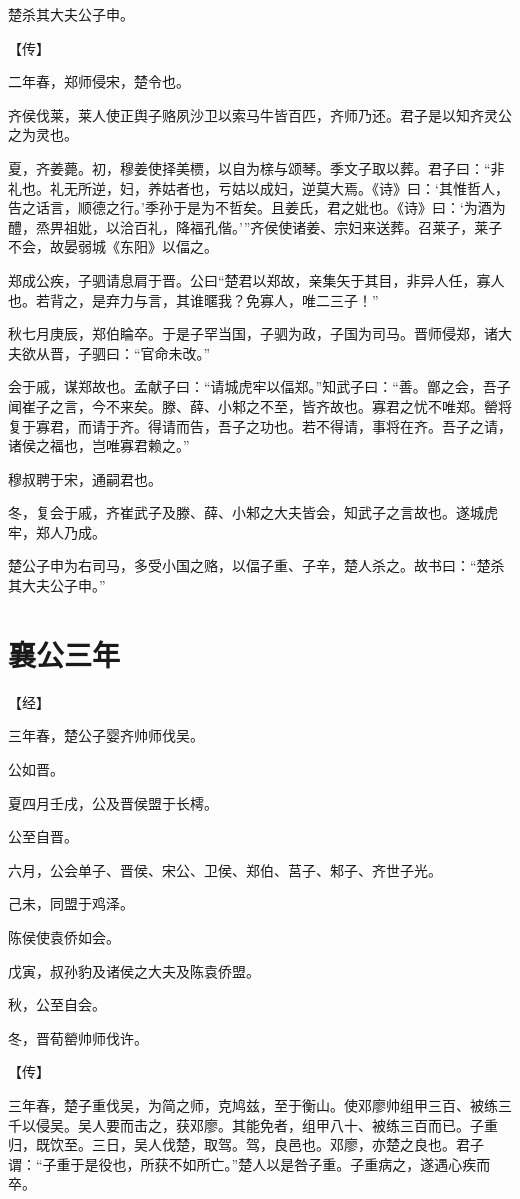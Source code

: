 \documentclass[a4paper,12pt,UTF8,twoside]{ctexbook}
\begin{document}
楚杀其大夫公子申。

【传】

二年春，郑师侵宋，楚令也。

齐侯伐莱，莱人使正舆子赂夙沙卫以索马牛皆百匹，齐师乃还。君子是以知齐灵公之为灵也。

夏，齐姜薨。初，穆姜使择美槚，以自为榇与颂琴。季文子取以葬。君子曰：“非礼也。礼无所逆，妇，养姑者也，亏姑以成妇，逆莫大焉。《诗》曰：‘其惟哲人，告之话言，顺德之行。’季孙于是为不哲矣。且姜氏，君之妣也。《诗》曰：‘为酒为醴，烝畀祖妣，以洽百礼，降福孔偕。’”齐侯使诸姜、宗妇来送葬。召莱子，莱子不会，故晏弱城《东阳》以偪之。

郑成公疾，子驷请息肩于晋。公曰“楚君以郑故，亲集矢于其目，非异人任，寡人也。若背之，是弃力与言，其谁暱我？免寡人，唯二三子！”

秋七月庚辰，郑伯睔卒。于是子罕当国，子驷为政，子国为司马。晋师侵郑，诸大夫欲从晋，子驷曰：“官命未改。”

会于戚，谋郑故也。孟献子曰：“请城虎牢以偪郑。”知武子曰：“善。鄫之会，吾子闻崔子之言，今不来矣。滕、薛、小邾之不至，皆齐故也。寡君之忧不唯郑。罃将复于寡君，而请于齐。得请而告，吾子之功也。若不得请，事将在齐。吾子之请，诸侯之福也，岂唯寡君赖之。”

穆叔聘于宋，通嗣君也。

冬，复会于戚，齐崔武子及滕、薛、小邾之大夫皆会，知武子之言故也。遂城虎牢，郑人乃成。

楚公子申为右司马，多受小国之赂，以偪子重、子辛，楚人杀之。故书曰：“楚杀其大夫公子申。”

\chapter{襄公三年}



【经】

三年春，楚公子婴齐帅师伐吴。

公如晋。

夏四月壬戌，公及晋侯盟于长樗。

公至自晋。

六月，公会单子、晋侯、宋公、卫侯、郑伯、莒子、邾子、齐世子光。

己未，同盟于鸡泽。

陈侯使袁侨如会。

戊寅，叔孙豹及诸侯之大夫及陈袁侨盟。

秋，公至自会。

冬，晋荀罃帅师伐许。

【传】

三年春，楚子重伐吴，为简之师，克鸠兹，至于衡山。使邓廖帅组甲三百、被练三千以侵吴。吴人要而击之，获邓廖。其能免者，组甲八十、被练三百而已。子重归，既饮至。三日，吴人伐楚，取驾。驾，良邑也。邓廖，亦楚之良也。君子谓：“子重于是役也，所获不如所亡。”楚人以是咎子重。子重病之，遂遇心疾而卒。
\end{document}
